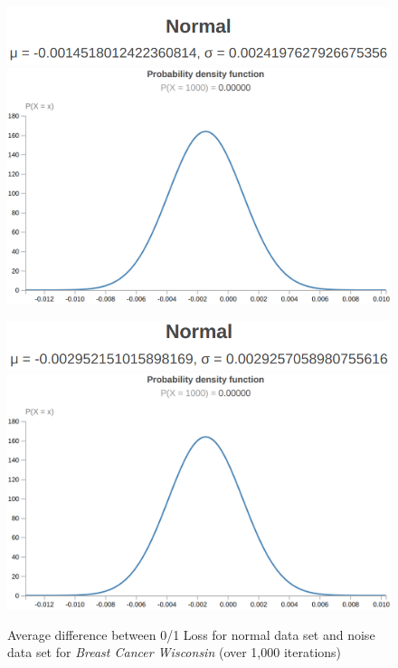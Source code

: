 \documentclass[twoside,11pt]{article}
\begin{document}
\begin{figure}[!hbp] %
    \centering
    \begin{minipage}[b]{0.3\textwidth}
        \includegraphics[width=\textwidth]{bs-l-ms.png}
        \includegraphics[width=\textwidth]{bs-l-ds.png}
        \caption{Average difference between 0/1 Loss for normal data set and noise data set for \emph{Breast Cancer Wisconsin} (over 1,000 iterations)}
    \end{minipage}
    \hfill
    \begin{minipage}[b]{0.3\textwidth}
        \includegraphics[width=\textwidth]{bs-p-ms.png}
        \includegraphics[width=\textwidth]{bs-l-ds.png}

\end{minipage}
\end{figure}
\end{document}
